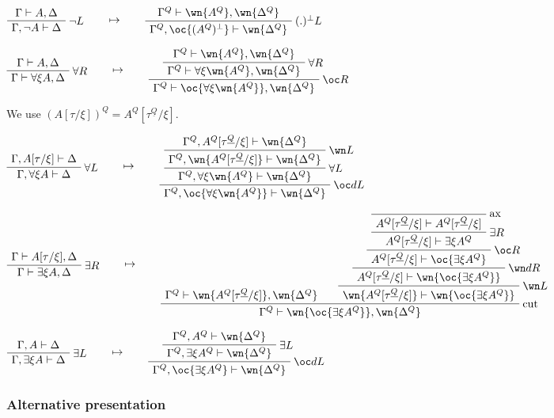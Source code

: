 \(\AxRule{\Gamma\vdash A,\Delta}
\LabelRule{\neg L}
\UnaRule{\Gamma,\neg A\vdash \Delta}
\DisplayProof
\qquad\mapsto\qquad
\AxRule{\Gamma^Q\vdash \wn{A^Q},\wn{\Delta^Q}}
\LabelRule{(.)\orth L}
\UnaRule{\Gamma^Q,\oc{(A^Q)\orth}\vdash \wn{\Delta^Q}}
\DisplayProof\)

\(\AxRule{\Gamma\vdash A,\Delta}
\LabelRule{\forall R}
\UnaRule{\Gamma\vdash \forall\xi A,\Delta}
\DisplayProof
\qquad\mapsto\qquad
\AxRule{\Gamma^Q\vdash \wn{A^Q},\wn{\Delta^Q}}
\LabelRule{\forall R}
\UnaRule{\Gamma^Q\vdash \forall\xi \wn{A^Q},\wn{\Delta^Q}}
\LabelRule{\oc R}
\UnaRule{\Gamma^Q\vdash \oc{\forall\xi \wn{A^Q}},\wn{\Delta^Q}}
\DisplayProof\)

We use \((A[\tau/\xi])^Q=A^Q[\tau^{\underline{Q}}/\xi]\).

\(\AxRule{\Gamma,A[\tau/\xi]\vdash \Delta}
\LabelRule{\forall L}
\UnaRule{\Gamma,\forall\xi A\vdash \Delta}
\DisplayProof
\qquad\mapsto\qquad
\AxRule{\Gamma^Q,A^Q[\tau^{\underline{Q}}/\xi]\vdash \wn{\Delta^Q}}
\LabelRule{\wn L}
\UnaRule{\Gamma^Q,\wn{A^Q[\tau^{\underline{Q}}/\xi]}\vdash \wn{\Delta^Q}}
\LabelRule{\forall L}
\UnaRule{\Gamma^Q,\forall\xi \wn{A^Q}\vdash \wn{\Delta^Q}}
\LabelRule{\oc d L}
\UnaRule{\Gamma^Q,\oc{\forall\xi \wn{A^Q}}\vdash \wn{\Delta^Q}}
\DisplayProof\)

\(\AxRule{\Gamma\vdash A[\tau/\xi],\Delta}
\LabelRule{\exists R}
\UnaRule{\Gamma\vdash \exists\xi A,\Delta}
\DisplayProof
\qquad\mapsto\qquad
\AxRule{\Gamma^Q\vdash \wn{A^Q[\tau^{\underline{Q}}/\xi]},\wn{\Delta^Q}}
\LabelRule{\rulename{ax}}
\NulRule{A^Q[\tau^{\underline{Q}}/\xi]\vdash A^Q[\tau^{\underline{Q}}/\xi]}
\LabelRule{\exists R}
\UnaRule{A^Q[\tau^{\underline{Q}}/\xi]\vdash \exists\xi A^Q}
\LabelRule{\oc R}
\UnaRule{A^Q[\tau^{\underline{Q}}/\xi]\vdash \oc{\exists\xi A^Q}}
\LabelRule{\wn d R}
\UnaRule{A^Q[\tau^{\underline{Q}}/\xi]\vdash \wn{\oc{\exists\xi A^Q}}}
\LabelRule{\wn L}
\UnaRule{\wn{A^Q[\tau^{\underline{Q}}/\xi]}\vdash \wn{\oc{\exists\xi A^Q}}}
\LabelRule{\rulename{cut}}
\BinRule{\Gamma^Q\vdash \wn{\oc{\exists\xi A^Q}},\wn{\Delta^Q}}
\DisplayProof\)

\(\AxRule{\Gamma,A\vdash \Delta}
\LabelRule{\exists L}
\UnaRule{\Gamma,\exists\xi A\vdash \Delta}
\DisplayProof
\qquad\mapsto\qquad
\AxRule{\Gamma^Q,A^Q\vdash \wn{\Delta^Q}}
\LabelRule{\exists L}
\UnaRule{\Gamma^Q,\exists\xi A^Q\vdash \wn{\Delta^Q}}
\LabelRule{\oc d L}
\UnaRule{\Gamma^Q,\oc{\exists\xi A^Q}\vdash \wn{\Delta^Q}}
\DisplayProof\)

\subsubsection{Alternative presentation}\label{alternative-presentation-1}

